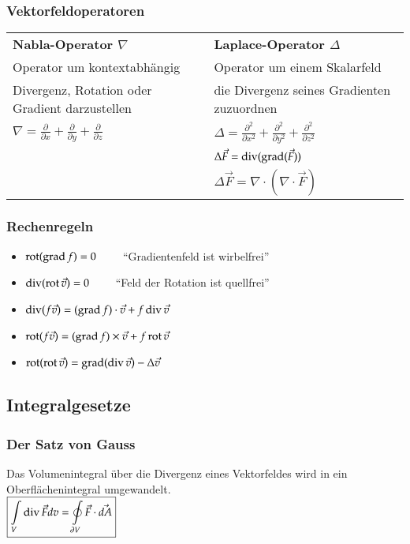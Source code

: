 \subsubsection{Vektorfeldoperatoren}
\begin{tabular}{ll}
	\textbf{Nabla-Operator $\nabla$} & \textbf{Laplace-Operator $\Delta$}\\
	Operator um kontextabhängig & Operator um einem Skalarfeld\\
	Divergenz, Rotation oder Gradient darzustellen  &  die Divergenz seines Gradienten zuzuordnen\\
	$\nabla=\frac{\partial}{\partial x}+\frac{\partial}{\partial y}+\frac{\partial}{\partial z}$&$\Delta=\frac{\partial^{2}}{\partial x^{2}}+\frac{\partial^{2}}{\partial y^{2}}+\frac{\partial^{2}}{\partial z^{2}}$\\
	&$\Delta \vec{F} = \operatorname{div}(\operatorname{grad}(\vec{F}))$\\
	&$\Delta \vec{F} = \nabla \cdot (\nabla \cdot \vec{F})$\\	 
\end{tabular}
\subsubsection{Rechenregeln}
\begin{itemize}
	\item $\operatorname{rot}(\operatorname{grad} f) = 0 \qquad $ ``Gradientenfeld ist wirbelfrei''
	\item $\operatorname{div}(\operatorname{rot} \vec{v}) = 0 \qquad $ ``Feld der Rotation ist quellfrei''
	\item $\operatorname{div}(f\vec{v}) = (\operatorname{grad} f) \cdot \vec{v} + f \operatorname{div} \vec{v}$
	\item $\operatorname{rot}(f\vec{v}) = (\operatorname{grad} f) \times \vec{v} + f \operatorname{rot} \vec{v}$
	\item $\operatorname{rot}(\operatorname{rot} \vec{v}) = \operatorname{grad}(\operatorname{div} \vec{v}) - \Delta \vec{v}$
\end{itemize}
\clearpage
\pagebreak
\subsection{Integralgesetze}
\subsubsection{Der Satz von Gauss}
Das Volumenintegral über die Divergenz eines Vektorfeldes wird in ein Oberflächenintegral umgewandelt.\\
$\boxed{\int\limits_V \operatorname{div} \vec F dv = \oint\limits_{\partial V} \vec F \cdot \vec{dA}}$
